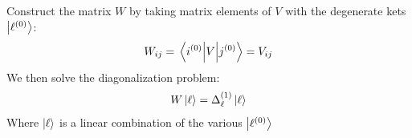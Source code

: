 \documentclass[12pt]{article}
\begin{document}
Construct the matrix $W$ by taking matrix elements of $V$ with the degenerate kets $\ket{\ell^{(0)}}$:
\begin{align*}
  W_{ij}=\mel{i^{(0)}}{V}{j^{(0)}}=V_{ij}
\end{align*}
We then solve the diagonalization problem:
\begin{align*}
  W\ket{\ell}=\Delta_\ell^{(1)}\ket{\ell}
\end{align*}
Where $\ket{\ell}$ is a linear combination of the various $\ket{\ell^{(0)}}$
\end{document}

